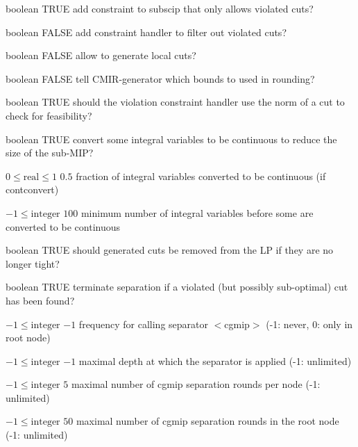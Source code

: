 %
{boolean}%
{TRUE}%
{add constraint to subscip that only allows violated cuts?}%
{}

%
{boolean}%
{FALSE}%
{add constraint handler to filter out violated cuts?}%
{}

%
{boolean}%
{FALSE}%
{allow to generate local cuts?}%
{}

%
{boolean}%
{FALSE}%
{tell CMIR-generator which bounds to used in rounding?}%
{}

%
{boolean}%
{TRUE}%
{should the violation constraint handler use the norm of a cut to check for feasibility?}%
{}

%
{boolean}%
{TRUE}%
{convert some integral variables to be continuous to reduce the size of the sub-MIP?}%
{}

%
{$0\leq\textrm{real}\leq1$}%
{$0.5$}%
{fraction of integral variables converted to be continuous (if contconvert)}%
{}

%
{$-1\leq\textrm{integer}$}%
{$100$}%
{minimum number of integral variables before some are converted to be continuous}%
{}

%
{boolean}%
{TRUE}%
{should generated cuts be removed from the LP if they are no longer tight?}%
{}

%
{boolean}%
{TRUE}%
{terminate separation if a violated (but possibly sub-optimal) cut has been found?}%
{}

%
{$-1\leq\textrm{integer}$}%
{$-1$}%
{frequency for calling separator $<$cgmip$>$ (-1: never, 0: only in root node)}%
{}

%
{$-1\leq\textrm{integer}$}%
{$-1$}%
{maximal depth at which the separator is applied (-1: unlimited)}%
{}

%
{$-1\leq\textrm{integer}$}%
{$5$}%
{maximal number of cgmip separation rounds per node (-1: unlimited)}%
{}

%
{$-1\leq\textrm{integer}$}%
{$50$}%
{maximal number of cgmip separation rounds in the root node (-1: unlimited)}%
{}

